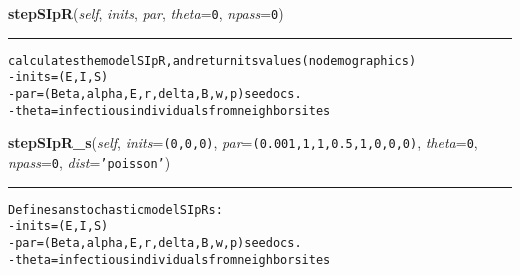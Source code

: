     \vspace{0.5ex}

    \begin{boxedminipage}{\textwidth}

    \raggedright \textbf{stepSIpR}(\textit{self}, \textit{inits}, \textit{par}, \textit{theta}=\texttt{0}, \textit{npass}=\texttt{0})

    \vspace{-1.5ex}

    \rule{\textwidth}{0.5\fboxrule}
\begin{alltt}

calculates the model SIpR, and return its values (no demographics)
- inits = (E,I,S)
- par = (Beta, alpha, E,r,delta,B, w, p) see docs.
- theta = infectious individuals from neighbor sites
\end{alltt}

    \vspace{1ex}

    \end{boxedminipage}

    \label{Epigrass:simobj:popmodels:stepSIpR_s}

    \vspace{0.5ex}

    \begin{boxedminipage}{\textwidth}

    \raggedright \textbf{stepSIpR\_s}(\textit{self}, \textit{inits}=\texttt{(0,0,0)}, \textit{par}=\texttt{(0.001,1,1,0.5,1,0,0,0)}, \textit{theta}=\texttt{0}, \textit{npass}=\texttt{0}, \textit{dist}=\texttt{'poisson'})

    \vspace{-1.5ex}

    \rule{\textwidth}{0.5\fboxrule}
\begin{alltt}

Defines an stochastic model SIpRs:
- inits = (E,I,S)
- par = (Beta, alpha, E,r,delta,B,w,p) see docs.
- theta = infectious individuals from neighbor sites
\end{alltt}

    \vspace{1ex}

    \end{boxedminipage}

    \label{Epigrass:simobj:popmodels:stepSEIpR}

